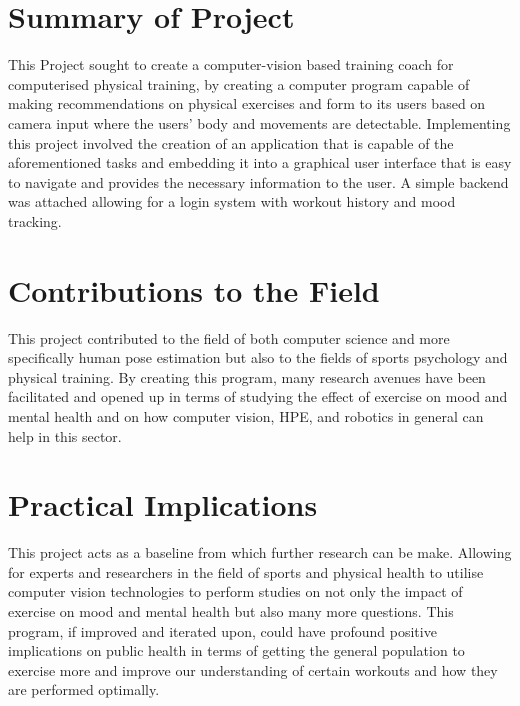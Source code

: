 


\section{Summary of Project}
    This Project sought to create a computer-vision based training coach for computerised physical training, by creating a computer program capable of making recommendations on physical exercises and form to its users based on camera input where the users' body and movements are detectable.
    Implementing this project involved the creation of an application that is capable of the aforementioned tasks and embedding it into a graphical user interface that is easy to navigate and provides the necessary information to the user. A simple backend was attached allowing for a login system with workout history and mood tracking.
    
\section{Contributions to the Field}
    This project contributed to the field of both computer science and more specifically human pose estimation but also to the fields of sports psychology and physical training. By creating this program, many research avenues have been facilitated and opened up in terms of studying the effect of exercise on mood and mental health and on how computer vision, HPE, and robotics in general can help in this sector.   
    
\section{Practical Implications}
    This project acts as a baseline from which further research can be make. Allowing for experts and researchers in the field of sports and physical health to utilise computer vision technologies to perform studies on not only the impact of exercise on mood and mental health but also many more questions. This program, if improved and iterated upon, could have profound positive implications on public health in terms of getting the general population to exercise more and improve our understanding of certain workouts and how they are performed optimally.
    

